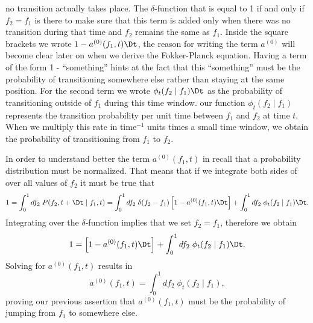 no transition actually takes place. The $\delta$-function that is equal to 1 if
and only if $f_2 = f_1$ is there to make sure that this term is added only when
there was no transition during that time and $f_2$ remains the same as $f_1$.
Inside the square brackets we wrote $1 - a^{(0)}(f_1, t) \Dt$, the reason
for writing the term $a^{(0)}$ will become clear later on when we derive the
Fokker-Planck equation. Having a term of the form 1 - ``something'' hints at the
fact that this ``something'' must be the probability of transitioning somewhere
else rather than staying at the same position. For the second term we wrote
$\phi_t(f_2 \mid f_1)\Dt$ as the probability of transitioning outside of $f_1$
during this time window. our function $\phi_t(f_2 \mid f_1)$ represents the
transition probability per unit time between $f_1$ and $f_2$ at time $t$. When
we multiply this rate in time$^{-1}$ units times a small time window, we obtain
the probability of transitioning from $f_1$ to $f_2$.

In order to understand better the term $a^{(0)}(f_1, t)$ in
 recall that a probability distribution must be
normalized. That means that if we integrate both sides of
 over all values of $f_2$ it must be true that
\begin{equation}
  1 = \int_0^1 df_2 \; P(f_2, t + \Dt \mid f_1, t) =
  \int_0^1 df_2 \; \delta(f_2 - f_1) \left[ 1 - a^{(0)}(f_1, t) \Dt \right]
  + \int_0^1 df_2 \; \phi_t(f_2 \mid f_1)\Dt.
\end{equation}
Integrating over the $\delta$-function implies that we set $f_2 = f_1$,
therefore we obtain
\begin{equation}
  1 = \left[  1 - a^{(0)}(f_1, t) \Dt\right] +
  \int_0^1 df_2 \; \phi_t(f_2 \mid f_1)\Dt.
\end{equation}
Solving for $a^{(0)}(f_1, t)$ results in
\begin{equation}
  a^{(0)}(f_1, t) = \int_0^1 df_2 \; \phi_t(f_2 \mid f_1),
  \label{eq_a0}
\end{equation}
proving our previous assertion that $a^{(0)}(f_1, t)$ must be the
probability of jumping from $f_1$ to somewhere else.

